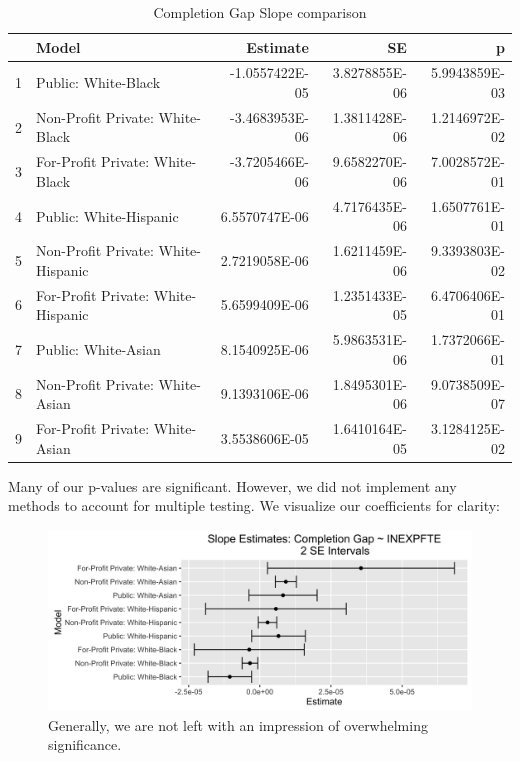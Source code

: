 \documentclass{article}
\begin{document}
\begin{table}[ht]
\centering
\caption{Completion Gap Slope comparison} 
\begin{tabular}{rlrrr}
  \hline
 & Model & Estimate & SE & p \\ 
  \hline
1 & Public: White-Black & -1.0557422E-05 & 3.8278855E-06 & 5.9943859E-03 \\ 
  2 & Non-Profit Private: White-Black & -3.4683953E-06 & 1.3811428E-06 & 1.2146972E-02 \\ 
  3 & For-Profit Private: White-Black & -3.7205466E-06 & 9.6582270E-06 & 7.0028572E-01 \\ 
  4 & Public: White-Hispanic & 6.5570747E-06 & 4.7176435E-06 & 1.6507761E-01 \\ 
  5 & Non-Profit Private: White-Hispanic & 2.7219058E-06 & 1.6211459E-06 & 9.3393803E-02 \\ 
  6 & For-Profit Private: White-Hispanic & 5.6599409E-06 & 1.2351433E-05 & 6.4706406E-01 \\ 
  7 & Public: White-Asian & 8.1540925E-06 & 5.9863531E-06 & 1.7372066E-01 \\ 
  8 & Non-Profit Private: White-Asian & 9.1393106E-06 & 1.8495301E-06 & 9.0738509E-07 \\ 
  9 & For-Profit Private: White-Asian & 3.5538606E-05 & 1.6410164E-05 & 3.1284125E-02 \\ 
   \hline
\end{tabular}
\end{table}
Many of our p-values are significant. However, we did not implement any methods to account for multiple testing. We visualize our coefficients for clarity:

\begin{figure}[H]
\centering
\includegraphics[width=1\textwidth]{../images/completion_gaps_results.png}
\caption{\label{fig: completion_gaps_plot} Generally, we are not left with an impression of overwhelming significance.}
\end{figure}
\end{document}
